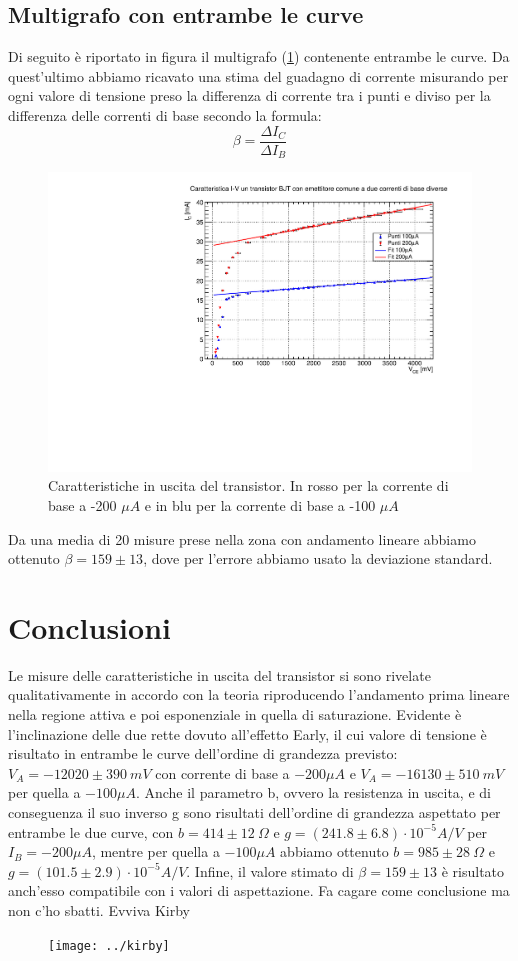 \documentclass[]{article}
\begin{document}
\subsection{Multigrafo con entrambe le curve}
Di seguito è riportato in figura il multigrafo (\ref{fig:multigrafo}) contenente entrambe le curve. Da quest'ultimo abbiamo ricavato una stima del guadagno di corrente misurando per ogni valore di tensione preso la differenza di corrente tra i punti e diviso per la differenza delle correnti di base secondo la formula:
\begin{equation}
	\beta=\frac{\Delta I_{C}}{\Delta I_{B}}
\end{equation}
	\begin{figure}[H]
		\centering
		\includegraphics[width=0.9\linewidth]{../c1}
		\caption{Caratteristiche in uscita del transistor. In rosso per la corrente di base a -200 $ \mu A $ e in blu per la corrente di base a -100 $ \mu A $}
		\label{fig:multigrafo}
	\end{figure}
Da una media di 20 misure prese nella zona con andamento lineare abbiamo ottenuto $ \beta =159\pm 13 $, dove per l'errore abbiamo usato la deviazione standard.
\section*{Conclusioni}
Le misure delle caratteristiche in uscita del transistor si sono rivelate qualitativamente in accordo con la teoria riproducendo l'andamento prima lineare nella regione attiva e poi esponenziale in quella di saturazione. Evidente è l'inclinazione delle due rette dovuto all'effetto Early, il cui valore di tensione è risultato in entrambe le curve dell'ordine di grandezza previsto: $ V_{A}=-12020\pm390\ mV $ con corrente di base a $ -200 \mu A $ e $ V_{A}=-16130\pm510\ mV $ per quella a $ -100 \mu A $.  
Anche il parametro b, ovvero la resistenza in uscita, e di conseguenza il suo inverso g sono risultati dell'ordine di grandezza aspettato per entrambe le due curve, con $ b=414\pm12\ \Omega $ e $ g=(241.8\pm6.8)\cdot 10^{-5} A/V $ per $ I_{B}= -200 \mu A $, mentre per quella a $ -100 \mu A $ abbiamo ottenuto $ b= 985\pm28\ \Omega$ e $ g=(101.5\pm2.9)\cdot 10^{-5} A/V  $. 
Infine, il valore stimato di $ \beta= 159\pm 13$ è risultato anch'esso compatibile con i valori di aspettazione.
Fa cagare come conclusione ma non c'ho sbatti. Evviva Kirby
\newpage
\begin{figure}
	\centering
	\texttt{[image: ../kirby]}
\end{figure}
\end{document}
